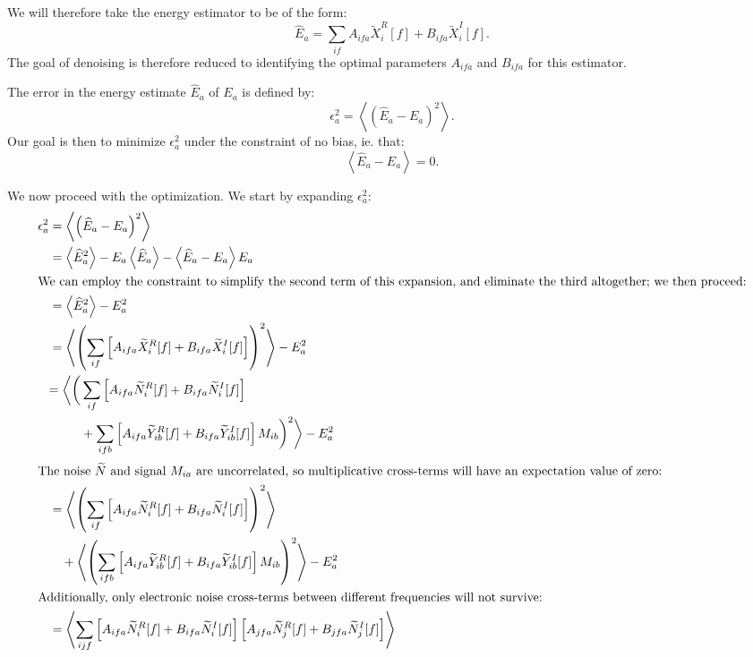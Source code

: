 We will therefore take the energy estimator to be of the form:
\[ \widehat{E}_a = \sum_{if} A_{ifa} \widetilde{X}_i^R[f] + B_{ifa} \widetilde{X}_i^I[f].\]
The goal of denoising is therefore reduced to identifying the optimal parameters $A_{ifa}$ and $B_{ifa}$ for this estimator.

The error in the energy estimate $\widehat{E}_a$ of $E_a$ is defined by:
\[ \epsilon^2_a = \left< \left(\widehat{E}_a - E_a\right)^2\right>. \]
Our goal is then to minimize $\epsilon^2_a$ under the constraint of no bias, ie. that:
\[\left<\widehat{E}_a - E_a\right> = 0.\]

We now proceed with the optimization.  We start by expanding $\epsilon^2_a$:
\begin{align*}
\epsilon^2_a &= \left< \left(\widehat{E}_a - E_a\right)^2\right> \\
%
&= \left< \widehat{E}^2_a \right> - E_a \left<\widehat{E}_a\right> - \left< \widehat{E}_a - E_a \right> E_a \\
%
\intertext{We can employ the constraint to simplify the second term of this expansion, and eliminate the third altogether; we then proceed:}
%
&= \left< \widehat{E}^2_a \right> - E^2_a \\
%
&= \left< \left(\sum_{if}\left[ A_{ifa} \widetilde{X}_i^R[f] + B_{ifa} \widetilde{X}_i^I[f]\right]\right)^2\right> - E^2_a \\
%
& \begin{aligned}= \bigg< \bigg(&
  \sum_{if} \left[ A_{ifa} \widetilde{N}_i^R[f] + B_{ifa} \widetilde{N}_i^I[f]\right] \\
  & + \sum_{ifb} \left[ A_{ifa} \widetilde{Y}_{ib}^R[f] + B_{ifa} \widetilde{Y}_{ib}^I[f]\right]M_{ib}  \bigg)^2 \bigg> - E^2_a
\end{aligned} \\
%
\intertext{The noise $\widetilde{N}$ and signal $M_{ia}$ are uncorrelated, so multiplicative cross-terms will have an expectation value of zero:}
%
&= \left< \left(\sum_{if} \left[ A_{ifa} \widetilde{N}_i^R[f] + B_{ifa} \widetilde{N}_i^I[f]\right]\right)^2\right> \\
&\quad + \left<\left(\sum_{ifb} \left[ A_{ifa} \widetilde{Y}_{ib}^R[f] + B_{ifa} \widetilde{Y}_{ib}^I[f]\right]M_{ib} \right)^2 \right> - E^2_a \\
%
\intertext{Additionally, only electronic noise cross-terms between different frequencies will not survive:}
%
&= \left< \sum_{ijf} \left[ A_{ifa} \widetilde{N}_i^R[f] + B_{ifa} \widetilde{N}_i^I[f]\right] \left[ A_{jfa} \widetilde{N}_j^R[f] + B_{jfa} \widetilde{N}_j^I[f]\right] \right> \\

\end{align*}
